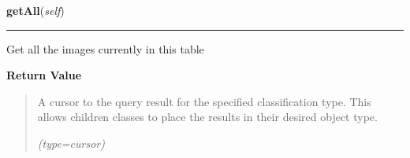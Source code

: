 \hspace{.8\funcindent}\begin{boxedminipage}{\funcwidth}

    \raggedright \textbf{getAll}(\textit{self})

    \vspace{-1.5ex}

    \rule{\textwidth}{0.5\fboxrule}
\setlength{\parskip}{2ex}
    Get all the images currently in this table

\setlength{\parskip}{1ex}
      \textbf{Return Value}
    \vspace{-1ex}

      \begin{quote}
      A cursor to the query result for the specified classification type. 
      This allows children classes to place the results in their desired 
      object type.

      {\it (type=cursor)}

      \end{quote}

    \end{boxedminipage}

    \label{src:dao:classification_dao:ClassificationDAO:updateClassificationByUID}

    \vspace{0.5ex}

